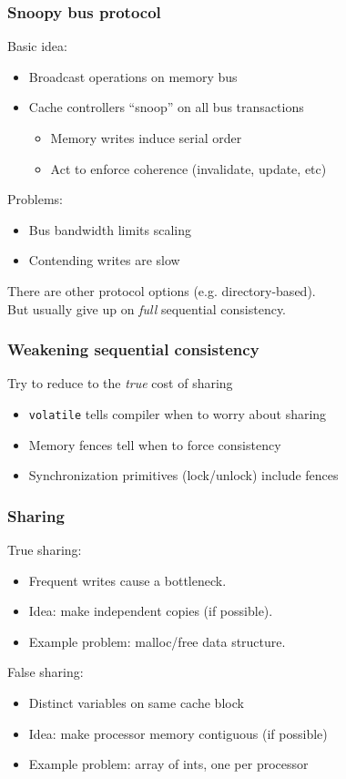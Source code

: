 \documentclass{beamer}
\begin{document}
\begin{frame}
  \frametitle{Snoopy bus protocol}

  Basic idea:
  \begin{itemize}
  \item Broadcast operations on memory bus
  \item Cache controllers ``snoop'' on all bus transactions
    \begin{itemize}
    \item Memory writes induce serial order
    \item Act to enforce coherence (invalidate, update, etc)
    \end{itemize}
  \end{itemize}

  Problems:
  \begin{itemize}
  \item Bus bandwidth limits scaling
  \item Contending writes are slow
  \end{itemize}

  \vspace{5mm}
  There are other protocol options (e.g. directory-based). \\
  But usually give up on {\em full} sequential consistency.

\end{frame}


\begin{frame}
  \frametitle{Weakening sequential consistency}

  Try to reduce to the {\em true} cost of sharing
  \begin{itemize}
  \item {\tt volatile} tells compiler when to worry about sharing
  \item Memory fences tell when to force consistency
  \item Synchronization primitives (lock/unlock) include fences
  \end{itemize}
  
\end{frame}


\begin{frame}
  \frametitle{Sharing}
  
  True sharing:
  \begin{itemize}
  \item Frequent writes cause a bottleneck.
  \item Idea: make independent copies (if possible).
  \item Example problem: malloc/free data structure.
  \end{itemize}
  
  \vspace{5mm}
  False sharing:
  \begin{itemize}
  \item Distinct variables on same cache block
  \item Idea: make processor memory contiguous (if possible)
  \item Example problem: array of ints, one per processor
  \end{itemize}
\end{frame}
\end{document}
